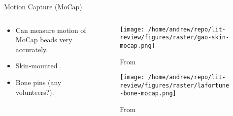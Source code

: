 \documentclass[presentation, aspectratio=1610]{beamer}
\begin{document}
\begin{frame}[label={sec:org0b90d2e}]{Motion Capture (MoCap)}
\begin{columns}
\begin{column}{0.5\columnwidth}
\begin{itemize}
\item Can measure motion of MoCap beads very accurately.
\item Skin-mounted \autocites{gaoInvestigationSoftTissue2008}[][]{kuoInfluenceSoftTissue2011}[][]{linEffectsSoftTissue2016}.
\item Bone pins \autocite{lafortuneThreedimensionalKinematicsHuman1992} (any volunteers?).
\end{itemize}
\end{column}

\begin{column}{0.6\columnwidth}
\begin{figure}[htbp]
\centering
\texttt{[image: /home/andrew/repo/lit-review/figures/raster/gao-skin-mocap.png]}
\caption{From \autocite{gaoInvestigationSoftTissue2008}}
\end{figure}
\vspace{-0.25in}
\begin{figure}[htbp]
\centering
\texttt{[image: /home/andrew/repo/lit-review/figures/raster/lafortune-bone-mocap.png]}
\caption{From \autocite{lafortuneThreedimensionalKinematicsHuman1992}}
\end{figure}
\end{column}
\end{columns}
\end{frame}
\end{document}
